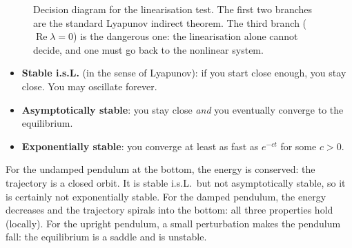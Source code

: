 \documentclass[11pt]{article}
\newcommand{\x}{\mathbf{x}}
\begin{document}
\begin{figure}[htbp]
\centering
{}
\caption{Decision diagram for the linearisation test.  The first two branches
are the standard Lyapunov indirect theorem.  The third branch
($\operatorname{Re}\lambda=0$) is the dangerous one: the linearisation alone
cannot decide, and one must go back to the nonlinear system.}
\label{fig:stability_flow}
\end{figure}

\begin{intuition}[title={The three stability words in plain language}]
\begin{itemize}[leftmargin=1.2em,itemsep=1pt]
  \item \textbf{Stable i.s.L.} (in the sense of Lyapunov): if you start close
        enough, you stay close.  You may oscillate forever.
  \item \textbf{Asymptotically stable}: you stay close \emph{and} you
        eventually converge to the equilibrium.
  \item \textbf{Exponentially stable}: you converge at least as fast as
        $e^{-ct}$ for some $c>0$.
\end{itemize}
For the undamped pendulum at the bottom, the energy is conserved: the
trajectory is a closed orbit.  It is stable i.s.L.\ but not asymptotically
stable, so it is certainly not exponentially stable.  For the damped
pendulum, the energy decreases and the trajectory spirals into the bottom:
all three properties hold (locally).  For the upright pendulum, a small
perturbation makes the pendulum fall: the equilibrium is a saddle and is
unstable.
\end{intuition}
\end{document}
